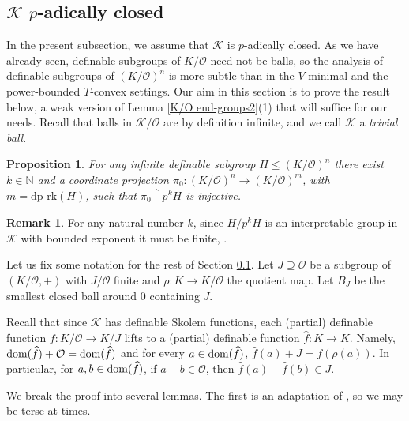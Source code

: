 \documentclass[11pt]{amsart}
\newtheorem{proposition}[theorem]{Proposition}
\theoremstyle{definition}
\newtheorem{remark}[theorem]{Remark}
\newcommand{\CK}{{\mathcal K}}
\newcommand{\CO}{{\mathcal O}}
\newcommand{\0}{\emptyset}
\newcommand{\rest}{\upharpoonright}
\def\dpr{\mathrm{dp\text{-}rk}}
\begin{document}
 \subsection{$\CK$ $p$-adically closed}\label{ss: p-closed}
In the present subsection, we assume that $\CK$ is $p$-adically closed. As we have already seen, definable subgroups of $K/\CO$ need not be balls, so the analysis of definable subgroups of $(K/\CO)^n$ is more subtle than in the $V$-minimal and the power-bounded $T$-convex settings. Our aim in this section is to prove the result below, a weak version of Lemma \ref{K/O end-groups2}(1) that will suffice for our needs. Recall that balls in $\CK/\CO$ are by definition infinite, and we call $\CK$ a {\em trivial ball}. 


	\begin{proposition}\label{P:local homeo K/O}		
    For any infinite definable subgroup $H\leq (K/\CO)^n$ 
		there exist $k\in \mathbb N$ and a coordinate projection $\pi_0:(K/\CO)^n\to (K/\CO)^m$, with $m=\dpr(H)$, such that $\pi_0\rest p^kH$ is injective.
	\end{proposition}
\begin{remark}
   For any natural number $k$, since $H/p^kH$ is an interpretable group in $\CK$ with bounded exponent it must be finite, \cite[Theorem 7.12(4b)]{HaHaPeGps}.
\end{remark}

	
	Let us fix some notation for the rest of Section \ref{ss: p-closed}. Let $J\supseteq \CO$ be a subgroup of $(K/\CO, +)$ with $J/\CO$ finite and  $\rho:K\to K/\CO$ the quotient map. Let $B_J$ be the smallest closed ball around $0$ containing $J$. 
	
	Recall that since $\CK$ has definable Skolem functions, each (partial) definable function $f: K/\CO\to K/J$ lifts to a (partial) definable function $\widehat f: K\to K$. Namely, $\dom(\widehat f)+\CO=\dom(\widehat f)$ and for every $a\in \operatorname{dom}(\widehat f)$, $\widehat f(a)+J= f(\rho(a))$. In particular, for $a,b\in \operatorname{dom}(\widehat f)$, if  $a-b\in \CO$, then $\widehat f(a)-\widehat f(b)\in J$. 
	
	
	
	We break the proof into several lemmas. The first is an adaptation of \cite[Proposition 3.21]{HaHaPeGps}, so we may be terse at times.
	
\end{document}
